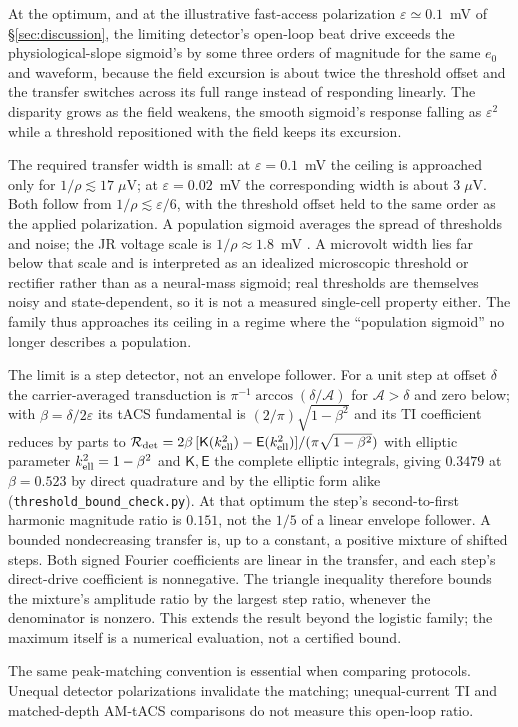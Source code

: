 At the optimum, and at the illustrative fast-access polarization $\varepsilon\!\simeq\!0.1$~mV of \S\ref{sec:discussion}, the limiting detector's open-loop beat drive exceeds the physiological-slope sigmoid's by some three orders of magnitude for the same $e_0$ and waveform, because the field excursion is about twice the threshold offset and the transfer switches across its full range instead of responding linearly. The disparity grows as the field weakens, the smooth sigmoid's response falling as $\varepsilon^2$ while a threshold repositioned with the field keeps its excursion.

The required transfer width is small: at $\varepsilon=0.1$~mV the ceiling is approached only for $1/\rho\lesssim17\;\mu$V; at $\varepsilon=0.02$~mV the corresponding width is about $3\;\mu$V. Both follow from $1/\rho\lesssim\varepsilon/6$, with the threshold offset held to the same order as the applied polarization. A population sigmoid averages the spread of thresholds and noise; the JR voltage scale is $1/\rho\approx1.8$~mV \cite{jansen1995}. A microvolt width lies far below that scale and is interpreted as an idealized microscopic threshold or rectifier rather than as a neural-mass sigmoid; real thresholds are themselves noisy and state-dependent, so it is not a measured single-cell property either. The family thus approaches its ceiling in a regime where the ``population sigmoid'' no longer describes a population.

The limit is a step detector, not an envelope follower. For a unit step at offset
$\delta$ the carrier-averaged transduction is $\pi^{-1}\arccos(\delta/\mathcal A)$ for $\mathcal A>\delta$
and zero below; with $\beta=\delta/2\varepsilon$ its tACS fundamental is
$(2/\pi)\sqrt{1-\beta^2}$ and its TI coefficient reduces by parts to
$\mathcal R_{\rm det}=2\beta\,[\mathsf K(k_{\rm ell}^2)-\mathsf E(k_{\rm ell}^2)]/(\pi\sqrt{1-\beta^2})$
with elliptic parameter $k_{\rm ell}^2=1-\beta^2$ and $\mathsf K,\mathsf E$
the complete elliptic integrals, giving $0.3479$ at $\beta=0.523$ by direct quadrature and
by the elliptic form alike (\texttt{threshold\_bound\_check.py}). At that optimum the
step's second-to-first harmonic magnitude ratio is $0.151$, not the $1/5$ of a linear
envelope follower. A bounded nondecreasing transfer is, up to a constant, a positive
mixture of shifted steps. Both signed Fourier coefficients are linear in the
transfer, and each step's direct-drive coefficient is nonnegative. The triangle
inequality therefore bounds the mixture's amplitude ratio by the largest step
ratio, whenever the denominator is nonzero. This extends the result beyond the
logistic family; the maximum itself is a numerical evaluation, not a certified bound.

The same peak-matching convention is essential when comparing protocols.
Unequal detector polarizations invalidate the matching; unequal-current TI
and matched-depth AM-tACS comparisons do not measure this open-loop ratio.



